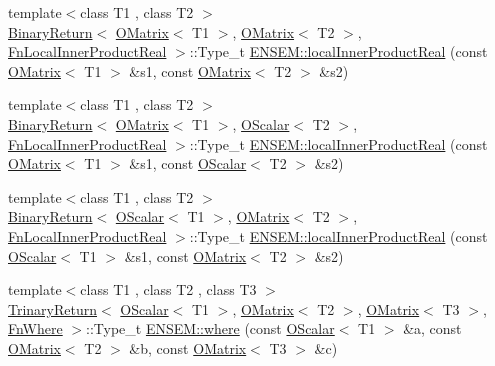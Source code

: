\begin{DoxyCompactItemize}
\item 
{\footnotesize template$<$class T1 , class T2 $>$ }\\\mbox{\hyperlink{structENSEM_1_1BinaryReturn}{Binary\+Return}}$<$ \mbox{\hyperlink{classENSEM_1_1OMatrix}{O\+Matrix}}$<$ T1 $>$, \mbox{\hyperlink{classENSEM_1_1OMatrix}{O\+Matrix}}$<$ T2 $>$, \mbox{\hyperlink{structENSEM_1_1FnLocalInnerProductReal}{Fn\+Local\+Inner\+Product\+Real}} $>$\+::Type\+\_\+t \mbox{\hyperlink{group__obsmatrix_gacc55b39949beec3cc3690b3c892801d2}{E\+N\+S\+E\+M\+::local\+Inner\+Product\+Real}} (const \mbox{\hyperlink{classENSEM_1_1OMatrix}{O\+Matrix}}$<$ T1 $>$ \&s1, const \mbox{\hyperlink{classENSEM_1_1OMatrix}{O\+Matrix}}$<$ T2 $>$ \&s2)
\item 
{\footnotesize template$<$class T1 , class T2 $>$ }\\\mbox{\hyperlink{structENSEM_1_1BinaryReturn}{Binary\+Return}}$<$ \mbox{\hyperlink{classENSEM_1_1OMatrix}{O\+Matrix}}$<$ T1 $>$, \mbox{\hyperlink{classENSEM_1_1OScalar}{O\+Scalar}}$<$ T2 $>$, \mbox{\hyperlink{structENSEM_1_1FnLocalInnerProductReal}{Fn\+Local\+Inner\+Product\+Real}} $>$\+::Type\+\_\+t \mbox{\hyperlink{group__obsmatrix_ga3b363fa48471a9d3fc6da5cbfcb21fb5}{E\+N\+S\+E\+M\+::local\+Inner\+Product\+Real}} (const \mbox{\hyperlink{classENSEM_1_1OMatrix}{O\+Matrix}}$<$ T1 $>$ \&s1, const \mbox{\hyperlink{classENSEM_1_1OScalar}{O\+Scalar}}$<$ T2 $>$ \&s2)
\item 
{\footnotesize template$<$class T1 , class T2 $>$ }\\\mbox{\hyperlink{structENSEM_1_1BinaryReturn}{Binary\+Return}}$<$ \mbox{\hyperlink{classENSEM_1_1OScalar}{O\+Scalar}}$<$ T1 $>$, \mbox{\hyperlink{classENSEM_1_1OMatrix}{O\+Matrix}}$<$ T2 $>$, \mbox{\hyperlink{structENSEM_1_1FnLocalInnerProductReal}{Fn\+Local\+Inner\+Product\+Real}} $>$\+::Type\+\_\+t \mbox{\hyperlink{group__obsmatrix_gad83f3516610f8446eb55b7e511c807be}{E\+N\+S\+E\+M\+::local\+Inner\+Product\+Real}} (const \mbox{\hyperlink{classENSEM_1_1OScalar}{O\+Scalar}}$<$ T1 $>$ \&s1, const \mbox{\hyperlink{classENSEM_1_1OMatrix}{O\+Matrix}}$<$ T2 $>$ \&s2)
\item 
{\footnotesize template$<$class T1 , class T2 , class T3 $>$ }\\\mbox{\hyperlink{structENSEM_1_1TrinaryReturn}{Trinary\+Return}}$<$ \mbox{\hyperlink{classENSEM_1_1OScalar}{O\+Scalar}}$<$ T1 $>$, \mbox{\hyperlink{classENSEM_1_1OMatrix}{O\+Matrix}}$<$ T2 $>$, \mbox{\hyperlink{classENSEM_1_1OMatrix}{O\+Matrix}}$<$ T3 $>$, \mbox{\hyperlink{structENSEM_1_1FnWhere}{Fn\+Where}} $>$\+::Type\+\_\+t \mbox{\hyperlink{group__obsmatrix_ga9938a7a656eaaa3617a11303334942ef}{E\+N\+S\+E\+M\+::where}} (const \mbox{\hyperlink{classENSEM_1_1OScalar}{O\+Scalar}}$<$ T1 $>$ \&a, const \mbox{\hyperlink{classENSEM_1_1OMatrix}{O\+Matrix}}$<$ T2 $>$ \&b, const \mbox{\hyperlink{classENSEM_1_1OMatrix}{O\+Matrix}}$<$ T3 $>$ \&c)
\end{DoxyCompactItemize}



